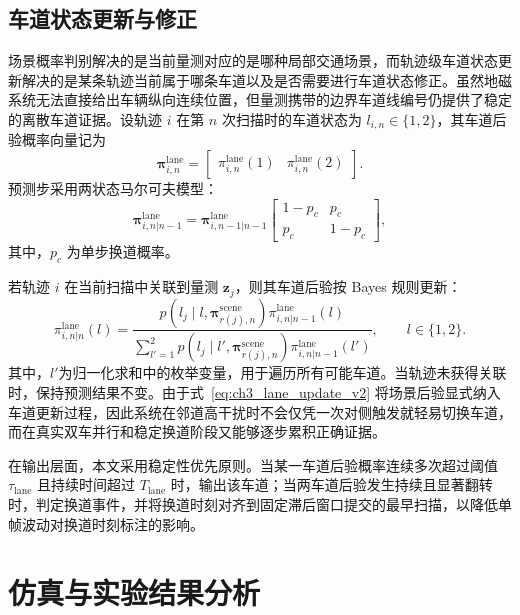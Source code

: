 \documentclass{xdupgthesis}
\begin{document}
\subsection{车道状态更新与修正}

场景概率判别解决的是当前量测对应的是哪种局部交通场景，而轨迹级车道状态更新解决的是某条轨迹当前属于哪条车道以及是否需要进行车道状态修正。虽然地磁系统无法直接给出车辆纵向连续位置，但量测携带的边界车道线编号仍提供了稳定的离散车道证据。设轨迹 $i$ 在第 $n$ 次扫描时的车道状态为 $l_{i,n}\in\{1,2\}$，其车道后验概率向量记为
\begin{equation}
	\boldsymbol\pi_{i,n}^{\mathrm{lane}}=
	\begin{bmatrix}
		\pi_{i,n}^{\mathrm{lane}}(1) &
		\pi_{i,n}^{\mathrm{lane}}(2)
	\end{bmatrix}.
	\label{eq:ch3_lane_vector_v2}
\end{equation}
预测步采用两状态马尔可夫模型：
\begin{equation}
	\boldsymbol\pi_{i,n|n-1}^{\mathrm{lane}}
	=
	\boldsymbol\pi_{i,n-1|n-1}^{\mathrm{lane}}
	\begin{bmatrix}
		1-p_c & p_c\\
		p_c & 1-p_c
	\end{bmatrix},
	\label{eq:ch3_lane_predict_v2}
\end{equation}
其中，$p_c$ 为单步换道概率。

若轨迹 $i$ 在当前扫描中关联到量测 $\mathbf z_j$，则其车道后验按 Bayes 规则更新：
\begin{equation}
	\pi_{i,n|n}^{\mathrm{lane}}(l)
	=
	\frac{p(l_j\mid l,\boldsymbol\pi_{r(j),n}^{\mathrm{scene}})\pi_{i,n|n-1}^{\mathrm{lane}}(l)}{\sum\limits_{l'=1}^{2}p(l_j\mid l',\boldsymbol\pi_{r(j),n}^{\mathrm{scene}})\pi_{i,n|n-1}^{\mathrm{lane}}(l')},
	\qquad l\in\{1,2\}.
	\label{eq:ch3_lane_update_v2}
\end{equation}
其中，$l'$为归一化求和中的枚举变量，用于遍历所有可能车道。当轨迹未获得关联时，保持预测结果不变。由于式~\eqref{eq:ch3_lane_update_v2} 将场景后验显式纳入车道更新过程，因此系统在邻道高干扰时不会仅凭一次对侧触发就轻易切换车道，而在真实双车并行和稳定换道阶段又能够逐步累积正确证据。

在输出层面，本文采用稳定性优先原则。当某一车道后验概率连续多次超过阈值 $\tau_{\mathrm{lane}}$ 且持续时间超过 $T_{\mathrm{lane}}$ 时，输出该车道；当两车道后验发生持续且显著翻转时，判定换道事件，并将换道时刻对齐到固定滞后窗口提交的最早扫描，以降低单帧波动对换道时刻标注的影响。


\section{仿真与实验结果分析}
\label{sec:ch3_experiment}
\end{document}
